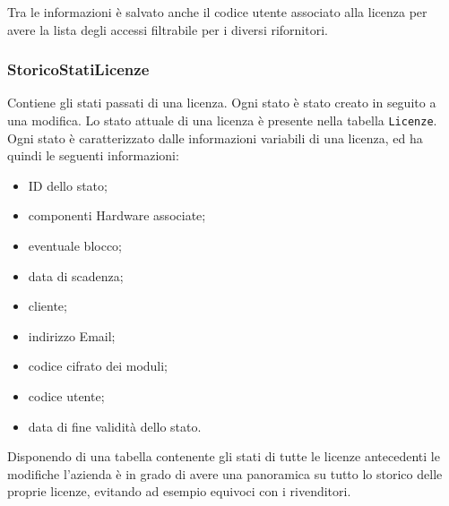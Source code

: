 Tra le informazioni è salvato anche il codice utente associato alla licenza per avere la lista degli accessi filtrabile per i diversi rifornitori.

\subsubsection{StoricoStatiLicenze}

Contiene gli stati passati di una licenza. Ogni stato è stato creato in seguito a una modifica. Lo stato attuale di una licenza è presente nella tabella \texttt{Licenze}.
\\Ogni stato è caratterizzato dalle informazioni variabili di una licenza, ed ha quindi le seguenti informazioni:

\begin{itemize}
\item ID dello stato;
\item componenti Hardware associate;
\item eventuale blocco;
\item data di scadenza;
\item cliente;
\item indirizzo Email;
\item codice cifrato dei moduli;
\item codice utente;
\item data di fine validità dello stato.
\end{itemize}

Disponendo di una tabella contenente gli stati di tutte le licenze antecedenti le modifiche l'azienda è in grado di avere una panoramica su tutto lo storico delle proprie licenze, evitando ad esempio equivoci con i rivenditori.